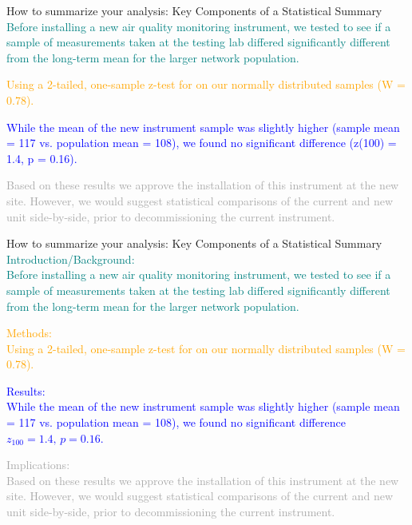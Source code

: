 \documentclass[
  ignorenonframetext,
]{beamer}
\begin{document}
\begin{frame}{How to summarize your analysis: Key Components of a
Statistical Summary}
\label{how-to-summarize-your-analysis-key-components-of-a-statistical-summary}
\textcolor{teal}{Before installing a new air quality monitoring instrument, we tested to see if a sample of measurements taken at the testing lab differed significantly different from the long-term mean for the larger network population.}

\textcolor{orange}{Using a 2-tailed, one-sample z-test for on our normally distributed samples (W = 0.78).}

\textcolor{blue}{While the mean of the new instrument sample was slightly higher (sample mean = 117 vs. population mean = 108), we found no significant difference (z(100) = 1.4, p = 0.16).}

\textcolor{darkgray}{Based on these results we approve the installation of this instrument at the new site. However, we would suggest statistical comparisons of the current and new unit side-by-side, prior to decommissioning the current instrument.}
\end{frame}

\begin{frame}{How to summarize your analysis: Key Components of a
Statistical Summary}
\label{how-to-summarize-your-analysis-key-components-of-a-statistical-summary-1}
\textcolor{teal}{Introduction/Background:\\
Before installing a new air quality monitoring instrument, we tested to see if a sample of measurements taken at the testing lab differed significantly different from the long-term mean for the larger network population.}

\textcolor{orange}{Methods:\\
Using a 2-tailed, one-sample z-test for on our normally distributed samples (W = 0.78).}

\textcolor{blue}{Results:\\
While the mean of the new instrument sample was slightly higher (sample mean = 117 vs. population mean = 108), we found no significant difference \( z_{100} = 1.4, \, p = 0.16 \).}

\textcolor{darkgray}{Implications:\\
Based on these results we approve the installation of this instrument at the new site. However, we would suggest statistical comparisons of the current and new unit side-by-side, prior to decommissioning the current instrument.}
\end{frame}
\end{document}
